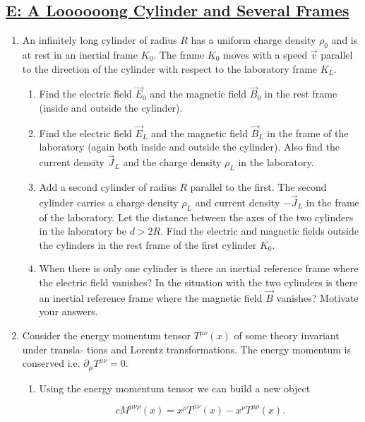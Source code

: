 \subsection{\hyperref[E: A Loooooong Cylinder and Several Frames]{E: A Loooooong Cylinder and Several Frames}}

\begin{enumerate}
	\item  An infinitely long cylinder of radius $R$ has a uniform charge density $\rho_{0}$ and is at rest in an inertial frame $K_{0}$. The frame $K_{0}$ moves with a speed $\vec{v}$ parallel to the direction of the cylinder with respect to the laboratory frame $K_{L}$.
	
	\begin{enumerate}
		\item  Find the electric field $\vec{E}_{0}$ and the magnetic field $\vec{B}_{0}$ in the rest frame (inside and
		outside the cylinder).
		\item  Find the electric field $\vec{E}_{L}$ and the magnetic field $\vec{B}_{L}$ in the frame of the laboratory (again both inside and outside the cylinder). Also find the current density $\vec{J}_{L}$ and
		the charge density $\rho_{L}$ in the laboratory.
		\item  Add a second cylinder of radius $R$ parallel to the first. The second cylinder carries a charge density $\rho_{L}$ and current density $-\vec{J}_{L}$ in the frame of the laboratory. Let the distance between the axes of the two cylinders in the laboratory be $d>2 R$. Find
		the electric and magnetic fields outside the cylinders in the rest frame of the first
		cylinder $K_{0}$.
		\item  When there is only one cylinder is there an inertial reference frame where the electric field vanishes? In the situation with the two cylinders is there an inertial reference frame where the magnetic field $\vec{B}$ vanishes? Motivate your answers.
	\end{enumerate}
	
	\item  Consider the energy momentum tensor $T^{\mu \nu}(x)$ of some theory invariant under transla-
	tions and Lorentz transformations. The energy momentum is conserved i.e. $\partial_{\mu} T^{\mu \nu}=0$.
	\begin{enumerate}
		\item Using the energy momentum tensor we can build a new object
		
		\begin{equation}
			cM^{\mu \nu \rho}(x)=x^{\rho} T^{\mu \nu}(x)-x^{\nu} T^{\mu \rho}(x).
		\end{equation}


\end{enumerate}
\end{enumerate}
